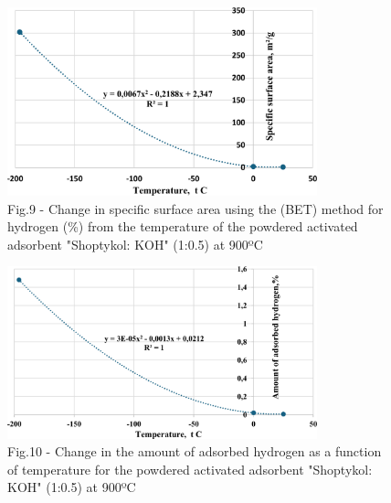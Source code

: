 \begin{figure}[H]
	\centering
	\includegraphics[width=0.8\textwidth]{media/chem4/image1}
	\caption*{Fig.9 - Change in specific surface area using the (BET) method for hydrogen (\%) from the temperature of the powdered activated adsorbent "Shoptykol: KOH" (1:0.5) at 900ºC}
\end{figure}
\begin{figure}[H]
	\centering
	\includegraphics[width=0.8\textwidth]{media/chem4/image2}
	\caption*{Fig.10 - Change in the amount of adsorbed hydrogen as a function of temperature for the powdered activated adsorbent "Shoptykol: KOH" (1:0.5) at 900ºC}
\end{figure}

